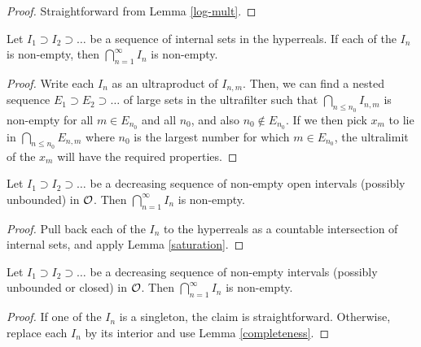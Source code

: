 \begin{proof}\leanok Straightforward from Lemma \ref{log-mult}.
\end{proof}

\begin{lemma}\label{saturation}\leanok Let $I_1 \supset I_2 \supset \dots$ be a sequence of internal sets in the hyperreals.  If each of the $I_n$ is non-empty, then $\bigcap_{n=1}^\infty I_n$ is non-empty.
\end{lemma}

\begin{proof}\leanok  Write each $I_n$ as an ultraproduct of $I_{n,m}$.  Then, we can find a nested sequence $E_1 \supset E_2 \supset \dots$ of large sets in the ultrafilter such that $\bigcap_{n \leq n_0} I_{n,m}$ is non-empty for all $m \in E_{n_0}$ and all $n_0$, and also $n_0 \not \in E_{n_0}$.  If we then pick $x_m$ to lie in $\bigcap_{n \leq n_0} E_{n,m}$ where $n_0$ is the largest number for which $m \in E_{n_0}$, the ultralimit of the $x_m$ will have the required properties.
\end{proof}

\begin{lemma}[Completeness]\label{completeness} Let $I_1 \supset I_2 \supset \dots$ be a decreasing sequence of non-empty open intervals (possibly unbounded) in ${\mathcal O}$.  Then $\bigcap_{n=1}^\infty I_n$ is non-empty.
\end{lemma}

\begin{proof} Pull back each of the $I_n$ to the hyperreals as a countable intersection of internal sets, and apply Lemma \ref{saturation}.
\end{proof}

\begin{lemma}[Completeness, II]\label{completeness-2} Let $I_1 \supset I_2 \supset \dots$ be a decreasing sequence of non-empty intervals (possibly unbounded or closed) in ${\mathcal O}$.  Then $\bigcap_{n=1}^\infty I_n$ is non-empty.
\end{lemma}

\begin{proof}   If one of the $I_n$ is a singleton, the claim is straightforward.  Otherwise, replace each $I_n$ by its interior and use Lemma \ref{completeness}.
\end{proof}


